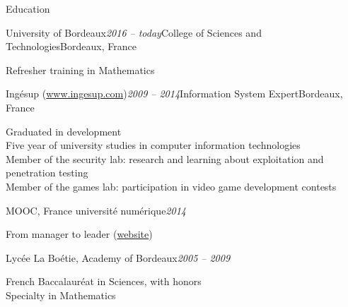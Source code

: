 \begin{rSection}{Education}

  \begin{rSubsection}{University of Bordeaux}{\em 2016 -- today}{College of Sciences and Technologies}{Bordeaux, France}
    \item[] Refresher training in Mathematics
  \end{rSubsection}

  \begin{rSubsection}{Ingésup (\href{www.ingesup.com}{www.ingesup.com})}{\em 2009 -- 2014}{Information System Expert}{Bordeaux, France}
    \item[] Graduated in development \\
    Five year of university studies in computer information technologies \\
    Member of the security lab: research and learning about exploitation and penetration testing \\
    Member of the games lab: participation in video game development contests
  \end{rSubsection}

  \begin{rSubsection}{MOOC, France université numérique}{\em 2014}{}{}
    \item[] From manager to leader (\href{https://www.france-universite-numerique-mooc.fr/courses/CNAM/01002/Trimestre_1_2014/about}{website})
  \end{rSubsection}

  \begin{rSubsection}{Lycée La Boétie, Academy of Bordeaux}{\em 2005 -- 2009}{}{}
    \item[] French Baccalauréat in Sciences, with honors \\
    Specialty in Mathematics
  \end{rSubsection}

\end{rSection}
